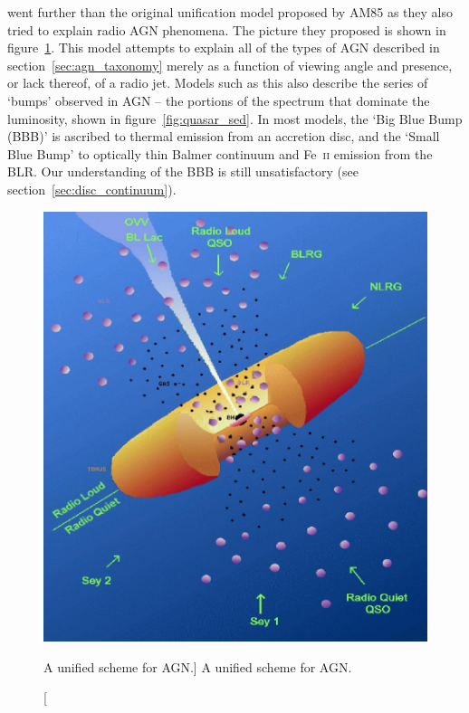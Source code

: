 \cite[][UP95]{UP95} went further than the original unification model
proposed by AM85 as they also tried to explain radio AGN phenomena.
The picture they proposed is shown in figure~\ref{fig:unification}.
This model attempts to explain all of the types of AGN described in
section~\ref{sec:agn_taxonomy} merely as a function of viewing angle
and presence, or lack thereof, of a radio jet. Models such as this also 
describe the series of `bumps' observed in AGN -- the portions
of the spectrum that dominate the luminosity, shown in figure~\ref{fig:quasar_sed}. 
In most models, the `Big Blue Bump (BBB)' is ascribed to thermal 
emission from an accretion disc, and the `Small Blue Bump' to optically 
thin Balmer continuum and Fe~\textsc{ii} emission from the BLR. 
Our understanding of the BBB is still unsatisfactory 
(see section~\ref{sec:disc_continuum}).

\begin{figure}
\centering
\includegraphics[width=1.0\textwidth]{figures/01-intro/up95.png}
\caption
[A unified scheme for AGN.]
{
A unified scheme for AGN.
} 
\label{fig:unification}
\end{figure} 

